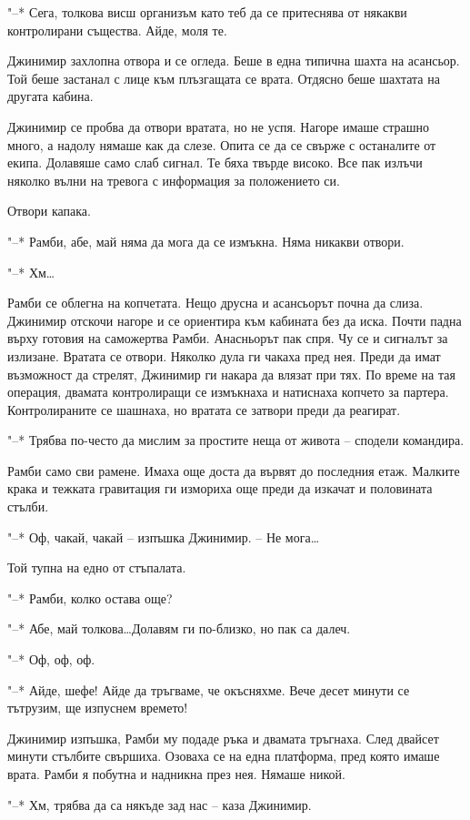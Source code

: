 \documentclass[ebook,openany,12pt]{memoir}
\begin{document}
"--* Сега, толкова висш организъм като теб да се притеснява от някакви контролирани същества. Айде, моля те.

Джинимир захлопна отвора и се огледа. Беше в една типична шахта на асансьор. Той беше застанал с лице към плъзгащата се врата. Отдясно беше шахтата на другата кабина.

Джинимир се пробва да отвори вратата, но не успя. Нагоре имаше страшно много, а надолу нямаше как да слезе. Опита се да се свърже с останалите от екипа. Долавяше само слаб сигнал. Те бяха твърде високо. Все пак излъчи няколко вълни на тревога с информация за положението си.

Отвори капака.

"--* Рамби, абе, май няма да мога да се измъкна. Няма никакви отвори.

"--* Хм\ldots

Рамби се облегна на копчетата. Нещо друсна и асансьорът почна да слиза. Джинимир отскочи нагоре и се ориентира към кабината без да иска. Почти падна върху готовия на саможертва Рамби. Анасньорът пак спря. Чу се и сигналът за излизане. Вратата се отвори. Няколко дула ги чакаха пред нея. Преди да имат възможност да стрелят, Джинимир ги накара да влязат при тях. По време на тая операция, двамата контролиращи се измъкнаха и натиснаха копчето за партера. Контролираните се шашнаха, но вратата се затвори преди да реагират.

"--* Трябва по-често да мислим за простите неща от живота – сподели командира.

Рамби само сви рамене. Имаха още доста да вървят до последния етаж. Малките крака и тежката гравитация ги измориха още преди да изкачат и половината стълби.

"--* Оф, чакай, чакай – изпъшка Джинимир. – Не мога\ldots

Той тупна на едно от стъпалата.

"--* Рамби, колко остава още?

"--* Абе, май толкова\ldots Долавям ги по-близко, но пак са далеч.

"--* Оф, оф, оф.

"--* Айде, шефе! Айде да тръгваме, че окъсняхме. Вече десет минути се тътрузим, ще изпуснем времето!

Джинимир изпъшка, Рамби му подаде ръка и двамата тръгнаха. След двайсет минути стълбите свършиха. Озоваха се на една платформа, пред която имаше врата. Рамби я побутна и надникна през нея. Нямаше никой.

"--* Хм, трябва да са някъде зад нас – каза Джинимир.
\end{document}
